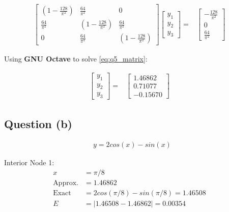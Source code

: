		\begin{align}
			\begin{bmatrix}
				\left(1-\frac{128}{\pi^{2}}\right) & \frac{64}{\pi^{2}} & 0 \\[0.7em]
				\frac{64}{\pi^{2}} & \left(1-\frac{128}{\pi^{2}}\right) & \frac{64}{\pi^{2}} \\[0.7em]
				0 & \frac{64}{\pi^{2}} & \left(1-\frac{128}{\pi^{2}}\right)
			\end{bmatrix}
			\begin{bmatrix}
				y_{1} \\[0.7em]
				y_{2} \\[0.7em]
				y_{3}
			\end{bmatrix}
			=&
			\begin{bmatrix}
				-\frac{128}{\pi^{2}} \\[0.7em]
				0 \\[0.7em]
				\frac{64}{\pi^{2}}
			\end{bmatrix}&
			\label{eq:q5_matrix}
		\end{align}

		Using \textbf{GNU Octave} to solve \cref{eq:q5_matrix}:

		\begin{align}
			\begin{bmatrix}
				y_{1} \\[0.7em]
				y_{2} \\[0.7em]
				y_{3}
			\end{bmatrix}
			=&
			\begin{bmatrix}
				1.46862 \\[0.7em]
				0.71077 \\[0.7em]
				-0.15670
			\end{bmatrix}&
		\end{align}

	\subsection{Question (b)}

		\begin{align}
			&y = 2cos(x) - sin(x)&
		\end{align}

		Interior Node 1:
		\begin{align}
				x &= \pi/8& \\
				\text{Approx.} &= 1.46862& \\
				\text{Exact} &= 2cos(\pi/8) - sin(\pi/8) = 1.46508& \\
				E &= |1.46508-1.46862| = 0.00354
		\end{align}

